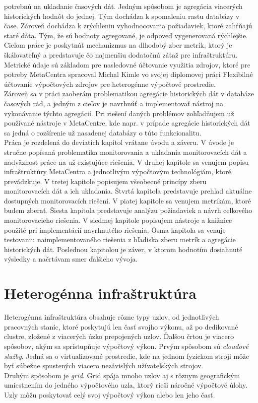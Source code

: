 \documentclass[printed,11pt,twoside,color,cover,table]{fithesis3}
\begin{document}
potrebnú na ukladanie časových dát. Jedným spôsobom je agregácia viacerých historických hodnôt do jednej. Tým dochádza k spomaleniu rastu
databázy v čase. Zároveň dochádza k zrýchleniu vyhodnocovania požiadaviek, ktoré zahŕňajú staré dáta. Tým, že sú hodnoty agregované,
je odpoveď vygenerovaná rýchlejšie.
\\Cieľom práce je poskytnúť mechanizmus na dlhodobý zber metrík, ktorý je škálovateľný a predstavuje čo najmenšiu dodatočnú záťaž
pre infraštruktúru. Metrické údaje sú základom pre nasledovné účtovanie využitia zdrojov, ktoré pre potreby MetaCentra spracoval
Michal Kimle vo svojej diplomovej práci Flexibilné účtovanie výpočtových zdrojov pre heterogénne výpočtové prostredie\cite{uctovanie}.
\\Zároveň sa v práci zaoberám problematikou agregácie historických dát v databáze časových rád, a jedným z cieľov je navrhnúť a 
implementovať nástroj na vykonávanie týchto agregácií. Pri riešení daných problémov zohľadňujem už používané nástroje v MetaCentre,
kde napr. v prípade agregácie historických dát sa jedná o rozšírenie už nasadenej databázy o túto funkcionalitu.
\\Práca je rozdelená do deviatich kapitol vrátane úvodu a záveru. V úvode je stručne popísaná problematika monitorovania a ukladania
monitorovacích dát a nadväznosť práce na už existujúce riešenia. V druhej kapitole sa venujem popisu infraštruktúry MetaCentra a 
jednotlivým výpočtovým technológiám, ktoré prevádzkuje. V tretej kapitole popisujem všeobecné princípy zberu monitorovacích dát
a ich ukladania. Štvrtá kapitola predstavuje prehľad aktuálne dostupných monitorovacích riešení. V piatej kapitole sa venujem
metrikám, ktoré budem zberať. Šiesta kapitola predstavuje analýzu požiadaviek a návrh celkového monitorovacieho riešenia.
V siedmej kapitole popisujem nástroje a knižnice použité pri implementácií navrhnutého riešenia. Ǒsma kapitola sa venuje
testovaniu naimplementovaného riešenia z hľadiska zberu metrík a agregácie historických dát. Poslednou kapitolou
je záver, v ktorom hodnotím dosiahnuté výsledky a načrtávam smer ďalšieho vývoja.

\chapter{Heterogénna infraštruktúra}
Heterogénna infraštruktúra obsahuje rôzne typy uzlov, od jednotlivých pracovných staníc, ktoré poskytujú len časť svojho výkonu, až po dedikované clustre, zložené z viacerých úzko prepojených uzlov.
Ďalšou črtou je viacero spôsobov, akým sa sprístupňuje výpočtový výkon. Prvým spôsobom sú \textit{cloudové služby}. Jedná sa o virtualizované prostredie, kde na jednom fyzickom stroji môže byť súbežne 
spustených viacero nezávislých užívateľských strojov.
\\Druhým spôsobom je \textit{grid}. Grid spája mnoho uzlov aj s rôznym geografickým umiestnením do jedného výpočtového uzla, ktorý rieši náročné výpočtové úlohy. Uzly môžu poskytovať celý svoj výpočtový výkon
alebo len jeho časť.
\end{document}
